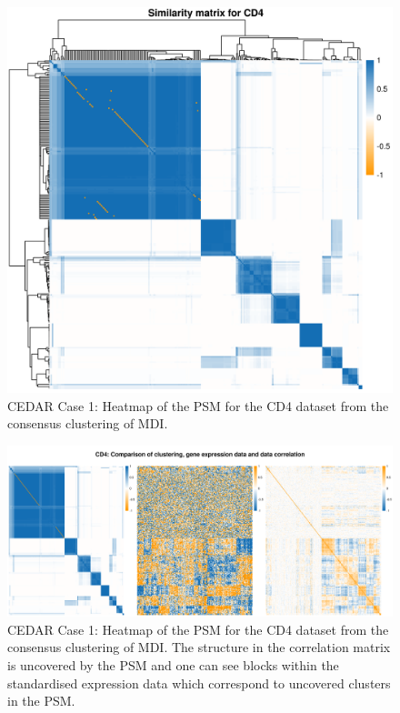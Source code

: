 \documentclass[12pt]{article} %
\begin{document}
	
	\begin{figure}[h]
		\centering
		\includegraphics[scale=0.75]{Images/Biology_data/Set_250/All_datasets/Similarity_matrices/similarity_matrix_CD4.png}
		\caption{CEDAR Case 1: Heatmap of the PSM for the CD4 dataset from the consensus clustering of MDI.}
		\label{fig:results:cedar_1:mdi_cd4_psm}
	\end{figure}
	
	\newpage
	
	\begin{figure}
		\centering
		\includegraphics[scale=0.5]{Images/Biology_data/Set_250/All_datasets/Comparison_expression_clustering_correlation/CD4.png}
		\caption{CEDAR Case 1: Heatmap of the PSM for the CD4 dataset from the consensus clustering of MDI. The structure in the correlation matrix is uncovered by the PSM and one can see blocks within the standardised expression data which correspond to uncovered clusters in the PSM.}
		\label{fig:results:cedar_1:mdi_cd4_psm_expr_cor}
	\end{figure}
\end{document}
